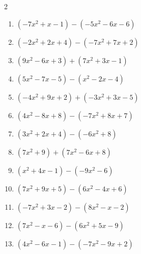 \begin{multicols}{2}
\begin{enumerate}
  \item $(-7x^{2}+x-1)-(-5x^{2}-6x-6)$


  \item $(-2x^{2}+2x+4)-(-7x^{2}+7x+2)$


  \item $(9x^{2}-6x+3)+(7x^{2}+3x-1)$


  \item $(5x^{2}-7x-5)-(x^{2}-2x-4)$


  \item $(-4x^{2}+9x+2)+(-3x^{2}+3x-5)$


  \item $(4x^{2}-8x+8)-(-7x^{2}+8x+7)$


  \item $(3x^{2}+2x+4)-(-6x^{2}+8)$


\columnbreak %

\resetques

  \item $(7x^{2}+9)+(7x^{2}-6x+8)$


  \item $(x^{2}+4x-1)-(-9x^{2}-6)$


  \item $(7x^{2}+9x+5)-(6x^{2}-4x+6)$


  \item $(-7x^{2}+3x-2)-(8x^{2}-x-2)$


  \item $(7x^{2}-x-6)-(6x^{2}+5x-9)$


  \item $(4x^{2}-6x-1)-(-7x^{2}-9x+2)$



\end{enumerate}
\end{multicols}
